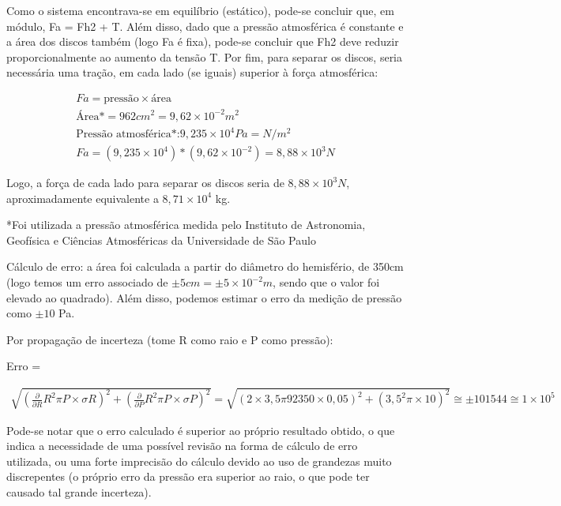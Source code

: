 Como o sistema encontrava-se em equilíbrio (estático), pode-se concluir que, em módulo, Fa = Fh2 + T. Além disso, dado que a pressão atmosférica é constante e a área dos discos também (logo Fa é fixa), pode-se concluir que Fh2 deve reduzir proporcionalmente ao aumento da tensão T. Por fim, para separar os discos, seria necessária uma tração, em cada lado (se iguais) superior à força atmosférica:

\begin{align*}
    Fa = \text{pressão} \times \text{área}\\
    \text{Área*} = 962 cm^2 = 9,62 \times 10^{-2}m^2\\
    \text{Pressão atmosférica*:} 9,235 \times 10^4 Pa = N/m^2\\
    Fa = (9,235 \times 10^4) * (9,62 \times 10^{-2}) = 8,88 \times 10^3 N  
\end{align*}

	Logo, a força de cada lado para separar os discos seria de \(8,88 \times 10^3 N\), aproximadamente equivalente a \(8,71 \times 10^4\) kg.
 
	*Foi utilizada a pressão atmosférica medida pelo Instituto de Astronomia, Geofísica e Ciências Atmosféricas da Universidade de São Paulo %

    
	Cálculo de erro: a área foi calculada a partir do diâmetro do hemisfério, de 350cm (logo temos um erro associado de \(\pm5cm = \pm5\times10^{-2}m\), sendo que o valor foi elevado ao quadrado). Além disso, podemos estimar o erro da medição de pressão como \(\pm 10\) Pa.

	Por propagação de incerteza (tome R como raio e P como pressão):
    
Erro =

\begin{align*}
\sqrt{\left( \frac{\partial }{\partial R} R^{2}\pi P \times\sigma R \right)^{2} + \left( \frac{\partial }{\partial P} R^{2}\pi P \times \sigma P \right)^{2}} =
\sqrt{\left( 2 \times 3,5\pi 92350 \times 0,05 \right)^{2} + \left(3,5^{2}\pi \times 10 \right)^{2}} \cong 
\pm101544  \cong  1 \times 10^5
\end{align*}

Pode-se notar que o erro calculado é superior ao próprio resultado obtido, o que indica a necessidade de uma possível revisão na forma de cálculo de erro utilizada, ou uma forte imprecisão do cálculo devido ao uso de grandezas muito discrepentes (o próprio erro da pressão era superior ao raio, o que pode ter causado tal grande incerteza).

